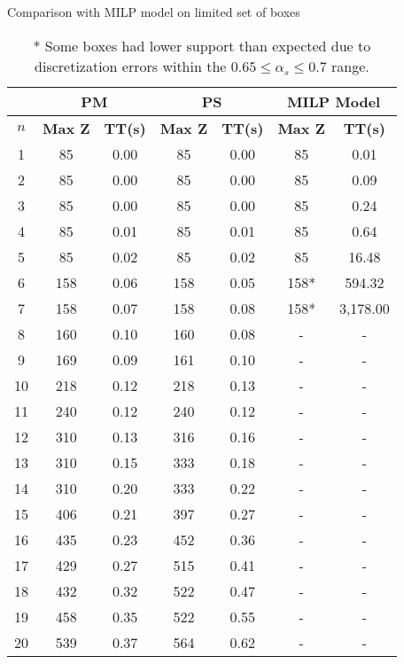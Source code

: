 \begin{table}[htbp]
    \centering
    \caption{Comparison with MILP model on limited set of boxes}
    \begin{tabular}{|c|c|c|c|c|c|c|}
    \hline
    & \multicolumn{ 2}{c|}{\textbf{PM}} & \multicolumn{ 2}{c|}{\textbf{PS}} & \multicolumn{ 2}{c|}{\textbf{MILP Model}} \\ \hline
    \textbf{$n$} & \textbf{Max Z} & \textbf{TT(s)} & \textbf{Max Z} & \textbf{TT(s)} & \textbf{Max Z} & \textbf{TT(s)} \\ \hline
    1 & 85 & 0.00 & 85 & 0.00 & 85 & 0.01 \\ 
    2 & 85 & 0.00 & 85 & 0.00 & 85 & 0.09 \\ 
    3 & 85 & 0.00 & 85 & 0.00 & 85 & 0.24 \\ 
    4 & 85 & 0.01 & 85 & 0.01 & 85 & 0.64 \\ 
    5 & 85 & 0.02 & 85 & 0.02 & 85 & 16.48 \\ 
    6 & 158 & 0.06 & 158 & 0.05 & 158* & 594.32 \\ 
    7 & 158 & 0.07 & 158 & 0.08 & 158* & 3,178.00 \\ \hline
    8 & 160 & 0.10 & 160 & 0.08 & - & - \\ 
    9 & 169 & 0.09 & 161 & 0.10 & - & - \\ 
    10 & 218 & 0.12 & 218 & 0.13 & - & - \\ 
    11 & 240 & 0.12 & 240 & 0.12 & - & - \\ 
    12 & 310 & 0.13 & 316 & 0.16 & - & - \\ 
    13 & 310 & 0.15 & 333 & 0.18 & - & - \\ 
    14 & 310 & 0.20 & 333 & 0.22 & - & - \\ 
    15 & 406 & 0.21 & 397 & 0.27 & - & - \\ 
    16 & 435 & 0.23 & 452 & 0.36 & - & - \\ 
    17 & 429 & 0.27 & 515 & 0.41 & - & - \\ 
    18 & 432 & 0.32 & 522 & 0.47 & - & - \\ 
    19 & 458 & 0.35 & 522 & 0.55 & - & - \\ 
    20 & 539 & 0.37 & 564 & 0.62 & - & - \\ \hline
    \end{tabular}
    \label{exp:model}
    \caption*{* Some boxes had lower support than expected due to discretization errors within the $ 0.65 \le \alpha_s \le 0.7$ range.}
    \end{table}
